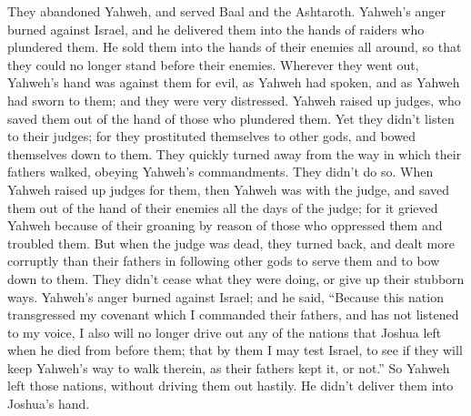 {They abandoned Yahweh, and served Baal and the Ashtaroth.
Yahweh’s anger burned against Israel, and he delivered them into the hands of raiders who plundered them. He sold them into the hands of their enemies all around, so that they could no longer stand before their enemies.
Wherever they went out, Yahweh’s hand was against them for evil, as Yahweh had spoken, and as Yahweh had sworn to them; and they were very distressed.
Yahweh raised up judges, who saved them out of the hand of those who plundered them.
Yet they didn’t listen to their judges; for they prostituted themselves to other gods, and bowed themselves down to them. They quickly turned away from the way in which their fathers walked, obeying Yahweh’s commandments. They didn’t do so.
When Yahweh raised up judges for them, then Yahweh was with the judge, and saved them out of the hand of their enemies all the days of the judge; for it grieved Yahweh because of their groaning by reason of those who oppressed them and troubled them.
But when the judge was dead, they turned back, and dealt more corruptly than their fathers in following other gods to serve them and to bow down to them. They didn’t cease what they were doing, or give up their stubborn ways.
Yahweh’s anger burned against Israel; and he said, “Because this nation transgressed my covenant which I commanded their fathers, and has not listened to my voice,
I also will no longer drive out any of the nations that Joshua left when he died from before them;
that by them I may test Israel, to see if they will keep Yahweh’s way to walk therein, as their fathers kept it, or not.”
So Yahweh left those nations, without driving them out hastily. He didn’t deliver them into Joshua’s hand.

}
